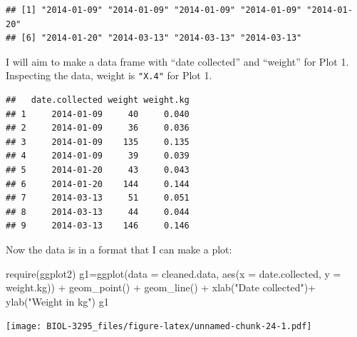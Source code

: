 \documentclass[
]{book}
\newenvironment{Shaded}{\begin{snugshade}}{\end{snugshade}}
\newcommand{\AttributeTok}[1]{\textcolor[rgb]{0.77,0.63,0.00}{#1}}
\newcommand{\CommentTok}[1]{\textcolor[rgb]{0.56,0.35,0.01}{\textit{#1}}}
\newcommand{\DecValTok}[1]{\textcolor[rgb]{0.00,0.00,0.81}{#1}}
\newcommand{\FloatTok}[1]{\textcolor[rgb]{0.00,0.00,0.81}{#1}}
\newcommand{\FunctionTok}[1]{\textcolor[rgb]{0.00,0.00,0.00}{#1}}
\newcommand{\NormalTok}[1]{#1}
\newcommand{\OtherTok}[1]{\textcolor[rgb]{0.56,0.35,0.01}{#1}}
\newcommand{\SpecialCharTok}[1]{\textcolor[rgb]{0.00,0.00,0.00}{#1}}
\newcommand{\StringTok}[1]{\textcolor[rgb]{0.31,0.60,0.02}{#1}}
\begin{document}
\begin{verbatim}
## [1] "2014-01-09" "2014-01-09" "2014-01-09" "2014-01-09" "2014-01-20"
## [6] "2014-01-20" "2014-03-13" "2014-03-13" "2014-03-13"
\end{verbatim}

I will aim to make a data frame with ``date collected'' and ``weight'' for Plot 1. Inspecting the data, weight is \texttt{"X.4"} for Plot 1.

\begin{Shaded}
\end{Shaded}

\begin{verbatim}
##   date.collected weight weight.kg
## 1     2014-01-09     40     0.040
## 2     2014-01-09     36     0.036
## 3     2014-01-09    135     0.135
## 4     2014-01-09     39     0.039
## 5     2014-01-20     43     0.043
## 6     2014-01-20    144     0.144
## 7     2014-03-13     51     0.051
## 8     2014-03-13     44     0.044
## 9     2014-03-13    146     0.146
\end{verbatim}

Now the data is in a format that I can make a plot:

\begin{Shaded}
\begin{Highlighting}[]
\FunctionTok{require}\NormalTok{(ggplot2)}
\NormalTok{g1}\OtherTok{=}\FunctionTok{ggplot}\NormalTok{(}\AttributeTok{data =}\NormalTok{ cleaned.data, }\FunctionTok{aes}\NormalTok{(}\AttributeTok{x =}\NormalTok{ date.collected, }\AttributeTok{y =}\NormalTok{ weight.kg)) }\SpecialCharTok{+} 
  \FunctionTok{geom\_point}\NormalTok{() }\SpecialCharTok{+}
  \FunctionTok{geom\_line}\NormalTok{() }\SpecialCharTok{+}
  \FunctionTok{xlab}\NormalTok{(}\StringTok{"Date collected"}\NormalTok{)}\SpecialCharTok{+}
  \FunctionTok{ylab}\NormalTok{(}\StringTok{"Weight in kg"}\NormalTok{)}
\NormalTok{g1}
\end{Highlighting}
\end{Shaded}

\texttt{[image: BIOL-3295\_files/figure-latex/unnamed-chunk-24-1.pdf]}
\end{document}
